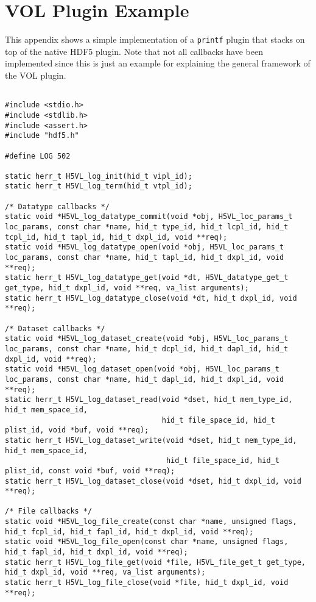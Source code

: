 \appendix
\section{VOL Plugin Example}
\label{sec:A}

This appendix shows a simple implementation of a {\tt printf} plugin that stacks on top of the native HDF5 plugin. Note that not all callbacks have been implemented since this is just an example for explaining the general framework of the VOL plugin.

\begin{lstlisting}

#include <stdio.h>
#include <stdlib.h>
#include <assert.h>
#include "hdf5.h"

#define LOG 502

static herr_t H5VL_log_init(hid_t vipl_id);
static herr_t H5VL_log_term(hid_t vtpl_id);

/* Datatype callbacks */
static void *H5VL_log_datatype_commit(void *obj, H5VL_loc_params_t loc_params, const char *name, hid_t type_id, hid_t lcpl_id, hid_t tcpl_id, hid_t tapl_id, hid_t dxpl_id, void **req);
static void *H5VL_log_datatype_open(void *obj, H5VL_loc_params_t loc_params, const char *name, hid_t tapl_id, hid_t dxpl_id, void **req);
static herr_t H5VL_log_datatype_get(void *dt, H5VL_datatype_get_t get_type, hid_t dxpl_id, void **req, va_list arguments);
static herr_t H5VL_log_datatype_close(void *dt, hid_t dxpl_id, void **req);

/* Dataset callbacks */
static void *H5VL_log_dataset_create(void *obj, H5VL_loc_params_t loc_params, const char *name, hid_t dcpl_id, hid_t dapl_id, hid_t dxpl_id, void **req);
static void *H5VL_log_dataset_open(void *obj, H5VL_loc_params_t loc_params, const char *name, hid_t dapl_id, hid_t dxpl_id, void **req);
static herr_t H5VL_log_dataset_read(void *dset, hid_t mem_type_id, hid_t mem_space_id,
                                    hid_t file_space_id, hid_t plist_id, void *buf, void **req);
static herr_t H5VL_log_dataset_write(void *dset, hid_t mem_type_id, hid_t mem_space_id,
                                     hid_t file_space_id, hid_t plist_id, const void *buf, void **req);
static herr_t H5VL_log_dataset_close(void *dset, hid_t dxpl_id, void **req);

/* File callbacks */
static void *H5VL_log_file_create(const char *name, unsigned flags, hid_t fcpl_id, hid_t fapl_id, hid_t dxpl_id, void **req);
static void *H5VL_log_file_open(const char *name, unsigned flags, hid_t fapl_id, hid_t dxpl_id, void **req);
static herr_t H5VL_log_file_get(void *file, H5VL_file_get_t get_type, hid_t dxpl_id, void **req, va_list arguments);
static herr_t H5VL_log_file_close(void *file, hid_t dxpl_id, void **req);


\end{lstlisting}
